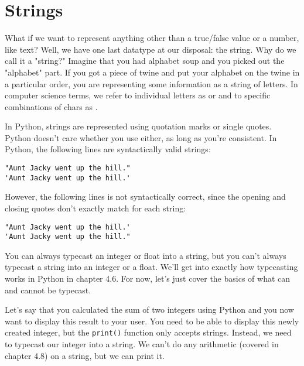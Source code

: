 \section{Strings}
What if we want to represent anything other than a true/false value or a number, like text? Well, we have one last datatype at our disposal: the string. Why do we call it a "string?" Imagine that you had alphabet soup and you picked out the "alphabet" part. If you got a piece of twine and put your alphabet on the twine in a particular order, you are representing some information as a string of letters. In computer science terms, we refer to individual letters as  or  and to specific combinations of chars as .\par
In Python, strings are represented using quotation marks or single quotes. Python doesn't care whether you use either, as long as you're consistent. In Python, the following lines are syntactically valid strings:
\begin{lstlisting}[style=pippython]
"Aunt Jacky went up the hill."
'Aunt Jacky went up the hill.'
\end{lstlisting}
However, the following lines is not syntactically correct, since the opening and closing quotes don't exactly match for each string:
\begin{lstlisting}[style=pippython]
"Aunt Jacky went up the hill.'
'Aunt Jacky went up the hill."
\end{lstlisting}
You can always typecast an integer or float into a string, but you can't always typecast a string into an integer or a float. We'll get into exactly how typecasting works in Python in chapter 4.6. For now, let's just cover the basics of what can and cannot be typecast.\par
Let's say that you calculated the sum of two integers using Python and you now want to display this result to your user. You need to be able to display this newly created integer, but the \verb|print()| function only accepts strings. Instead, we need to typecast our integer into a string. We can't do any arithmetic (covered in chapter 4.8) on a string, but we can print it.\par
